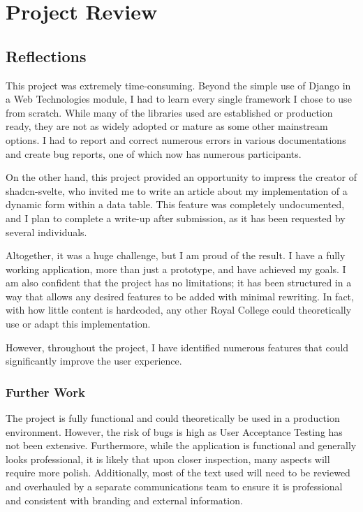\chapter{Project Review}
\section{Reflections}
This project was extremely time-consuming. Beyond the simple use of Django in a Web Technologies module, I had to learn every single framework I chose to use from scratch. While many of the libraries used are established or production ready, they are not as widely adopted or mature as some other mainstream options. I had to report and correct numerous errors in various documentations and create bug reports, one of which now has numerous participants.

On the other hand, this project provided an opportunity to impress the creator of shadcn-svelte, who invited me to write an article about my implementation of a dynamic form within a data table. This feature was completely undocumented, and I plan to complete a write-up after submission, as it has been requested by several individuals.

Altogether, it was a huge challenge, but I am proud of the result. I have a fully working application, more than just a prototype, and have achieved my goals. I am also confident that the project has no limitations; it has been structured in a way that allows any desired features to be added with minimal rewriting. In fact, with how little content is hardcoded, any other Royal College could theoretically use or adapt this implementation.

However, throughout the project, I have identified numerous features that could significantly improve the user experience.

\subsection{Further Work}
The project is fully functional and could theoretically be used in a production environment. However, the risk of bugs is high as User Acceptance Testing has not been extensive. Furthermore, while the application is functional and generally looks professional, it is likely that upon closer inspection, many aspects will require more polish. Additionally, most of the text used will need to be reviewed and overhauled by a separate communications team to ensure it is professional and consistent with branding and external information.

